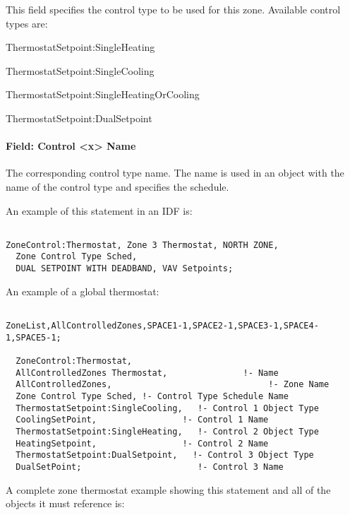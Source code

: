 This field specifies the control type to be used for this zone. Available control types are:

ThermostatSetpoint:SingleHeating

ThermostatSetpoint:SingleCooling

ThermostatSetpoint:SingleHeatingOrCooling

ThermostatSetpoint:DualSetpoint

\paragraph{Field: Control \textless{}x\textgreater{} Name}\label{field-control-x-name}

The corresponding control type name. The name is used in an object with the name of the control type and specifies the schedule.

An example of this statement in an IDF is:

\begin{lstlisting}

ZoneControl:Thermostat, Zone 3 Thermostat, NORTH ZONE,
  Zone Control Type Sched,
  DUAL SETPOINT WITH DEADBAND, VAV Setpoints;
\end{lstlisting}

An example of a global thermostat:

\begin{lstlisting}

ZoneList,AllControlledZones,SPACE1-1,SPACE2-1,SPACE3-1,SPACE4-1,SPACE5-1;

  ZoneControl:Thermostat,
  AllControlledZones Thermostat,               !- Name
  AllControlledZones,                               !- Zone Name
  Zone Control Type Sched, !- Control Type Schedule Name
  ThermostatSetpoint:SingleCooling,   !- Control 1 Object Type
  CoolingSetPoint,                 !- Control 1 Name
  ThermostatSetpoint:SingleHeating,   !- Control 2 Object Type
  HeatingSetpoint,                 !- Control 2 Name
  ThermostatSetpoint:DualSetpoint,   !- Control 3 Object Type
  DualSetPoint;                       !- Control 3 Name
\end{lstlisting}

A complete zone thermostat example showing this statement and all of the objects it must reference is:

